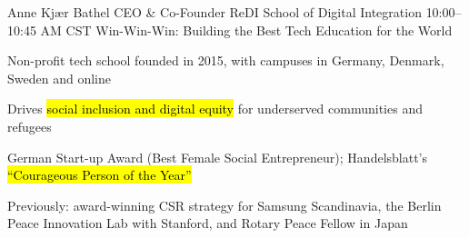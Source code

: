   {Anne Kjær Bathel}
  {CEO \& Co-Founder \textperiodcentered{} ReDI School of Digital Integration}
  {10:00--10:45 AM CST}
  {Win-Win-Win: Building the Best Tech Education for the World}
  {\item Non-profit tech school founded in 2015, with campuses in Germany, Denmark, Sweden and online
   \item Drives \hl{social inclusion and digital equity} for underserved communities and refugees
   \item German Start-up Award (Best Female Social Entrepreneur); Handelsblatt's \hl{``Courageous Person of the Year''}
   \item Previously: award-winning CSR strategy for Samsung Scandinavia, the Berlin Peace Innovation Lab with Stanford, and Rotary Peace Fellow in Japan}
